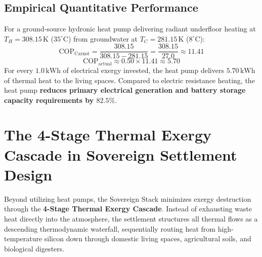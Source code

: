 \subsection{Empirical Quantitative Performance}
For a ground-source hydronic heat pump delivering radiant underfloor heating at $T_H = 308.15\,\mathrm{K}$ ($35^\circ\mathrm{C}$) from groundwater at $T_C = 281.15\,\mathrm{K}$ ($8^\circ\mathrm{C}$):
\begin{equation}
\mathrm{COP}_{\mathrm{Carnot}} = \frac{308.15}{308.15 - 281.15} = \frac{308.15}{27.0} \approx 11.41
\label{eq:ground_cop_carnot}
\end{equation}
\begin{equation}
\mathrm{COP}_{\mathrm{actual}} \approx 0.50 \times 11.41 \approx 5.70
\label{eq:ground_cop_actual}
\end{equation}
For every $1.0\,\mathrm{kWh}$ of electrical exergy invested, the heat pump delivers $5.70\,\mathrm{kWh}$ of thermal heat to the living spaces. Compared to electric resistance heating, the heat pump \textbf{reduces primary electrical generation and battery storage capacity requirements by $82.5\%$}.

\section{The 4-Stage Thermal Exergy Cascade in Sovereign Settlement Design}
\label{sec:th_cascade}

Beyond utilizing heat pumps, the Sovereign Stack minimizes exergy destruction through the \textbf{4-Stage Thermal Exergy Cascade}. Instead of exhausting waste heat directly into the atmosphere, the settlement structures all thermal flows as a descending thermodynamic waterfall, sequentially routing heat from high-temperature silicon down through domestic living spaces, agricultural soils, and biological digesters.

